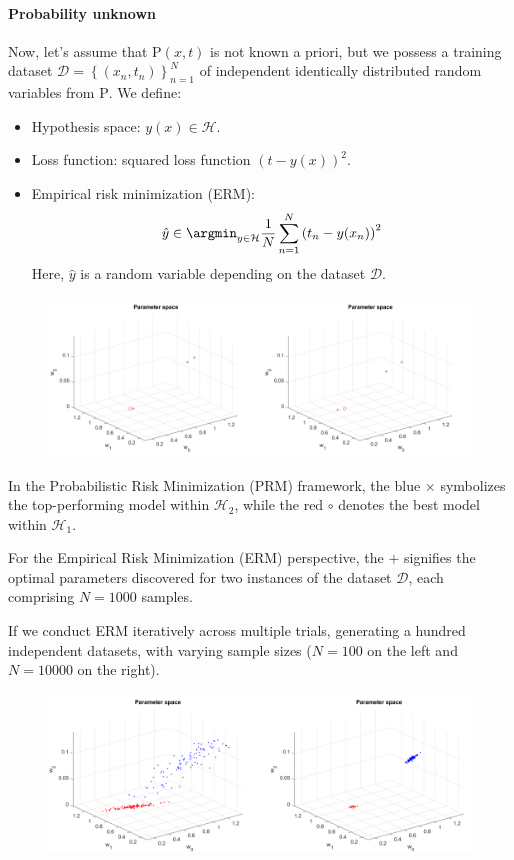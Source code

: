 \paragraph*{Probability unknown}
Now, let's assume that $\text{P}(x,t)$  is not known a priori, but we possess a training dataset $\mathcal{D}=\left\{ (x_n,t_n) \right\}_{n=1}^N$ of independent identically distributed random variables from $\text{P}$.
We define: 
\begin{itemize}
    \item Hypothesis space: $y(x) \in\mathcal{H}$. 
    \item Loss function: squared loss function $(t-y(x))^2$. 
    \item Empirical risk minimization (ERM):
        \[\hat{y}\in\argmin_{y \in \mathcal{H}}\dfrac{1}{N}\sum_{n=1}^{N}\left( t_n-y(x_n)\right)^2\]
        Here, $\hat{y}$ is a random variable depending on the dataset $\mathcal{D}$. 
\end{itemize}
\begin{figure}[H]
    \centering
    \includegraphics[width=0.75\linewidth]{images/bias1.png}
\end{figure}
In the Probabilistic Risk Minimization (PRM) framework, the blue $\times$ symbolizes the top-performing model within $\mathcal{H}_2$, while the red $\circ$ denotes the best model within $\mathcal{H}_1$.

For the Empirical Risk Minimization (ERM) perspective, the $+$ signifies the optimal parameters discovered for two instances of the dataset $\mathcal{D}$, each comprising $N = 1000$ samples.

If we conduct ERM iteratively across multiple trials, generating a hundred independent datasets, with varying sample sizes ($N = 100$ on the left and $N = 10000$ on the right).
\begin{figure}[H]
    \centering
    \includegraphics[width=0.75\linewidth]{images/bias2.png}
\end{figure}

